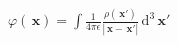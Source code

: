 \documentclass[12pt]{standalone}
\newcommand{\dd}{\, \mathrm{d}}
\newcommand{\xq}{\, \mathbf{x}}
\begin{document}
$\displaystyle
   \varphi(\xq)
    =\int \frac{1}{4\pi\epsilon}
    \frac{\rho(\xq')}{|\xq-\xq'|} \dd^3 \xq'  
$
\end{document}
